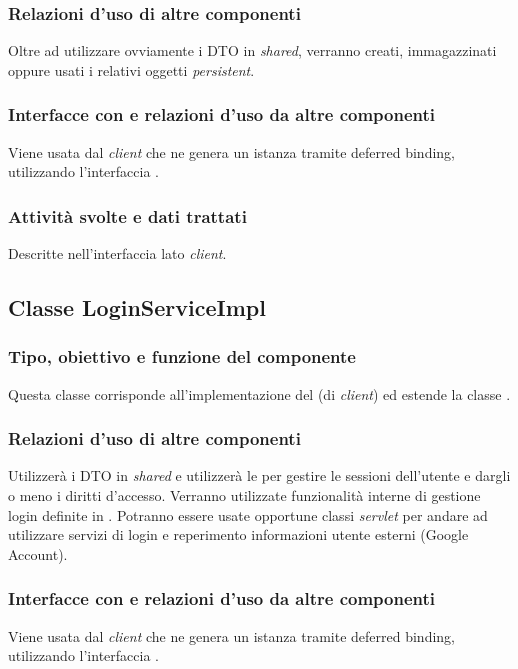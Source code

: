 \subsubsection*{Relazioni d'uso di altre componenti}
Oltre ad utilizzare ovviamente i DTO in \emph{shared}, verranno creati,
immagazzinati oppure usati i relativi oggetti \emph{persistent}.

\subsubsection*{Interfacce con e relazioni d'uso da altre componenti}
Viene usata dal \emph{client} che ne genera un istanza tramite deferred binding,
utilizzando l'interfaccia .

\subsubsection*{Attivit\`a svolte e dati trattati}
Descritte nell'interfaccia lato \emph{client}.

\subsection{Classe LoginServiceImpl}
\subsubsection*{Tipo, obiettivo e funzione del componente}
Questa classe corrisponde all'implementazione del  (di
\emph{client}) ed estende la classe .

\subsubsection*{Relazioni d'uso di altre componenti}
Utilizzer\`a i DTO in \emph{shared} e utilizzer\`a le  per
gestire le sessioni dell'utente e dargli o meno i diritti d'accesso.
Verranno utilizzate funzionalit\`a interne di gestione login definite in
. Potranno essere usate opportune classi \emph{servlet} per
andare ad utilizzare servizi di login e reperimento informazioni utente esterni
(Google Account).

\subsubsection*{Interfacce con e relazioni d'uso da altre componenti}
Viene usata dal \emph{client} che ne genera un istanza tramite deferred binding,
utilizzando l'interfaccia .

